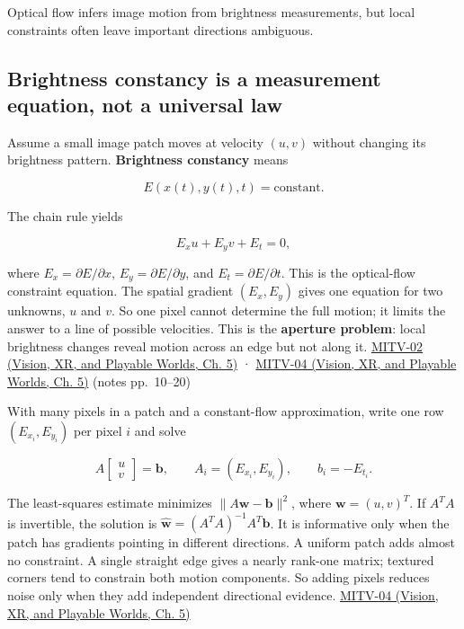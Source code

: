 Optical flow infers image motion from brightness measurements, but local constraints often leave important directions ambiguous.

\subsection{Brightness constancy is a measurement equation, not a universal law}\label{04-visual-computing-ii-ch030-brightness-constancy-is-a-measurement-equation-not-a-universal-law}

\hypertarget{04-visual-computing-ii-ch030-brightness-constancy-is-a-measurement-equation-not-a-universal-law}{}

Assume a small image patch moves at velocity \((u,v)\) without changing its brightness pattern. \textbf{Brightness constancy} means

\[
E(x(t),y(t),t)=\text{constant}.
\]

The chain rule yields

\[
E_xu+E_yv+E_t=0,
\]

where \(E_x=\partial E/\partial x\), \(E_y=\partial E/\partial y\), and \(E_t=\partial E/\partial t\). This is the optical-flow constraint equation. The spatial gradient \((E_x,E_y)\) gives one equation for two unknowns, \(u\) and \(v\). So one pixel cannot determine the full motion; it limits the answer to a line of possible velocities. This is the \textbf{aperture problem}: local brightness changes reveal motion across an edge but not along it. \href{../07-Vision-XR-and-Playable-Worlds/main.pdf\#nameddest=04-visual-computing-ii-ch036-mitv-02---image-formation-perspective-projection-time-derivative-motion-field}{MITV-02 (Vision, XR, and Playable Worlds, Ch. 5)} · \href{../07-Vision-XR-and-Playable-Worlds/main.pdf\#nameddest=04-visual-computing-ii-ch036-mitv-04---fixed-optical-flow-optical-mouse-constant-brightness-assumption-closed-form-solution}{MITV-04 (Vision, XR, and Playable Worlds, Ch. 5)} (notes pp.~10--20)

With many pixels in a patch and a constant-flow approximation, write one row \((E_{x_i},E_{y_i})\) per pixel \(i\) and solve

\[
A\begin{bmatrix}u\\v\end{bmatrix}=\mathbf{b},\qquad A_i=(E_{x_i},E_{y_i}),\qquad b_i=-E_{t_i}.
\]

The least-squares estimate minimizes \(\|A\mathbf{w}-\mathbf{b}\|^2\), where \(\mathbf{w}=(u,v)^T\). If \(A^TA\) is invertible, the solution is \(\hat{\mathbf{w}}=(A^TA)^{-1}A^T\mathbf{b}\). It is informative only when the patch has gradients pointing in different directions. A uniform patch adds almost no constraint. A single straight edge gives a nearly rank-one matrix; textured corners tend to constrain both motion components. So adding pixels reduces noise only when they add independent directional evidence. \href{../07-Vision-XR-and-Playable-Worlds/main.pdf\#nameddest=04-visual-computing-ii-ch036-mitv-04---fixed-optical-flow-optical-mouse-constant-brightness-assumption-closed-form-solution}{MITV-04 (Vision, XR, and Playable Worlds, Ch. 5)}

